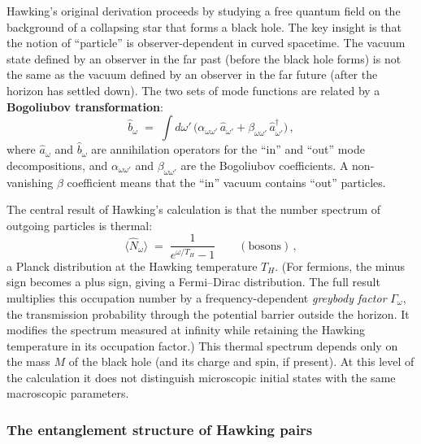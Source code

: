 \documentclass[11pt,letterpaper]{article}
\theoremstyle{plain}
\theoremstyle{definition}
\theoremstyle{remark}
\begin{document}
Hawking's original derivation \cite{hawking1975} proceeds by studying a
free quantum field on the background of a collapsing star that forms a
black hole.  The key insight is that the notion of ``particle'' is
observer-dependent in curved spacetime.  The vacuum state defined by
an observer in the far past (before the black hole forms) is not the
same as the vacuum defined by an observer in the far future (after the
horizon has settled down).  The two sets of mode functions are related
by a \textbf{Bogoliubov transformation}:
\begin{equation}\label{eq03:bogoliubov}
  \hat{b}_{\omega} \;=\; \int d\omega'\,
  \bigl(\alpha_{\omega\omega'}\, \hat{a}_{\omega'}
  + \beta_{\omega\omega'}\, \hat{a}_{\omega'}^{\dagger}\bigr)\,,
\end{equation}
where $\hat{a}_{\omega}$ and $\hat{b}_{\omega}$ are annihilation
operators for the ``in'' and ``out'' mode decompositions, and
$\alpha_{\omega\omega'}$ and $\beta_{\omega\omega'}$ are the
Bogoliubov coefficients.  A non-vanishing $\beta$ coefficient means
that the ``in'' vacuum contains ``out'' particles.

The central result of Hawking's calculation is that the number
spectrum of outgoing particles is thermal:
\begin{equation}\label{eq03:planckian}
  \langle \hat{N}_{\omega} \rangle
  \;=\; \frac{1}{e^{\omega / T_{H}} - 1}
  \qquad (\text{bosons})\,,
\end{equation}
a Planck distribution at the Hawking temperature $T_{H}$.  (For
fermions, the minus sign becomes a plus sign, giving a Fermi--Dirac
distribution.  The full result multiplies this occupation number by a
frequency-dependent \emph{greybody factor} $\Gamma_{\omega}$, the
transmission probability through the potential barrier outside the
horizon. It modifies the spectrum measured at infinity while retaining the
Hawking temperature in its occupation factor.)
This thermal spectrum depends only on the mass $M$
of the black hole (and its charge and spin, if present).  At this level of the calculation it does not distinguish microscopic
initial states with the same macroscopic parameters.

\subsubsection*{The entanglement structure of Hawking pairs}
\end{document}
